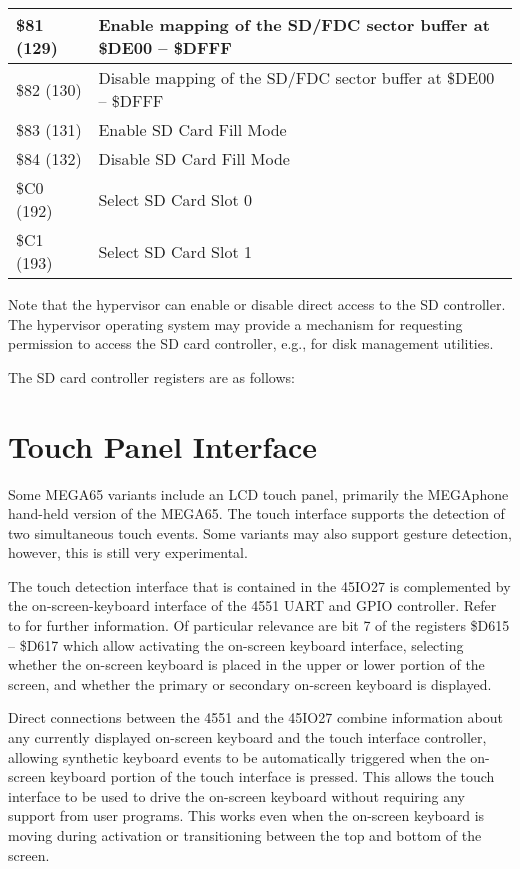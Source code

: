 \begin{enumerate}
\begin{longtable}{|L{2.4cm}|L{8cm}|}
 \hline
\small \$81 (129) & Enable mapping of the SD/FDC sector buffer at
\$DE00 -- \$DFFF \\
 \hline
\small \$82 (130) & Disable mapping of the SD/FDC sector buffer at
\$DE00 -- \$DFFF \\
 \hline
\small \$83 (131) & Enable SD Card Fill Mode \\
 \hline
\small \$84 (132) & Disable SD Card Fill Mode \\
 \hline
\small \$C0 (192) & Select SD Card Slot 0 \\
 \hline
\small \$C1 (193) & Select SD Card Slot 1 \\
 \hline
   \end{longtable}


Note that the hypervisor can enable or disable direct access to the SD
controller. The hypervisor operating system may provide a mechanism
for requesting permission to access the SD card controller, e.g., for
disk management utilities.

The SD card controller registers are as follows:



\section{Touch Panel Interface}

Some MEGA65 variants include an LCD touch panel, primarily the
MEGAphone hand-held version of the MEGA65.  The touch interface
supports the detection of two simultaneous touch events.  Some
variants may also support gesture detection, however, this is still
very experimental.

The touch detection interface that is contained in the 45IO27 is
complemented by the on-screen-keyboard interface of the 4551 UART and
GPIO controller.  Refer to  for further
information.  Of particular relevance are bit 7 of the registers \$D615 --
\$D617 which allow activating the on-screen keyboard interface,
selecting whether the on-screen keyboard is placed in the upper or
lower portion of the screen, and whether the primary or secondary
on-screen keyboard is displayed.

Direct connections between the 4551 and the 45IO27 combine information
about any currently displayed on-screen keyboard and the touch
interface controller, allowing synthetic keyboard events to be
automatically triggered when the on-screen keyboard portion of the
touch interface is pressed.  This allows the touch interface to be
used to drive the on-screen keyboard without requiring any support
from user programs. This works even when the on-screen keyboard is
moving during activation or transitioning between the top and bottom
of the screen.


\end{enumerate}
